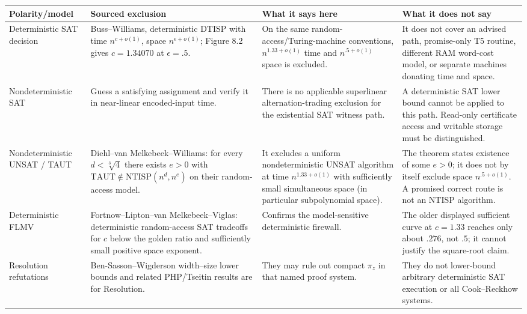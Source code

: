 \documentclass[11pt]{article}
\begin{document}
\begin{center}
\small
\begin{tabular}{p{.19\linewidth}p{.25\linewidth}p{.28\linewidth}p{.20\linewidth}}
\toprule
Polarity/model & Sourced exclusion & What it says here & What it does not say\\
\midrule
Deterministic SAT decision & Buss--Williams, deterministic DTISP with time $n^{c+o(1)}$, space $n^{\epsilon+o(1)}$; Figure 8.2 gives $c=1.34070$ at $\epsilon=.5$. & On the same random-access/Turing-machine conventions, $n^{1.33+o(1)}$ time and $n^{.5+o(1)}$ space is excluded. & It does not cover an advised path, promise-only T5 routine, different RAM word-cost model, or separate machines donating time and space.\\
Nondeterministic SAT & Guess a satisfying assignment and verify it in near-linear encoded-input time. & There is no applicable superlinear alternation-trading exclusion for the existential SAT witness path. & A deterministic SAT lower bound cannot be applied to this path.  Read-only certificate access and writable storage must be distinguished.\\
Nondeterministic UNSAT / TAUT & Diehl--van Melkebeek--Williams: for every $d<\sqrt[3]{4}$ there exists $e>0$ with $\mathrm{TAUT}\notin\mathrm{NTISP}(n^d,n^e)$ on their random-access model. & It excludes a uniform nondeterministic UNSAT algorithm at time $n^{1.33+o(1)}$ with sufficiently small simultaneous space (in particular subpolynomial space). & The theorem states existence of some $e>0$; it does not by itself exclude space $n^{.5+o(1)}$.  A promised correct route is not an NTISP algorithm.\\
Deterministic FLMV & Fortnow--Lipton--van Melkebeek--Viglas: deterministic random-access SAT tradeoffs for $c$ below the golden ratio and sufficiently small positive space exponent. & Confirms the model-sensitive deterministic firewall. & The older displayed sufficient curve at $c=1.33$ reaches only about $.276$, not $.5$; it cannot justify the square-root claim.\\
Resolution refutations & Ben-Sasson--Wigderson width--size lower bounds and related PHP/Tseitin results are for Resolution. & They may rule out compact $\pi_z$ in that named proof system. & They do not lower-bound arbitrary deterministic SAT execution or all Cook--Reckhow systems.\\
\bottomrule
\end{tabular}
\end{center}
\end{document}
